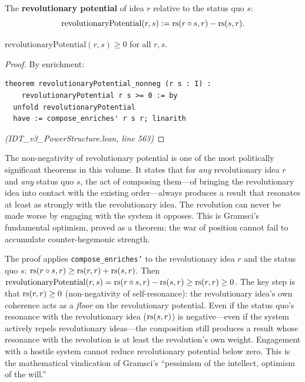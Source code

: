 \begin{definition}
\label{def:revolutionary}
The \textbf{revolutionary potential} of idea $r$ relative to the status quo $s$:
\[
  \mathrm{revolutionaryPotential}(r, s) := \mathrm{rs}(r \circ s, r) - \mathrm{rs}(s, r).
\]
\end{definition}

\begin{theorem}
\label{thm:rev-nonneg}
$\mathrm{revolutionaryPotential}(r, s) \geq 0$ for all $r, s$.
\end{theorem}

\begin{proof}
By enrichment:
\begin{lstlisting}
theorem revolutionaryPotential_nonneg (r s : I) :
    revolutionaryPotential r s >= 0 := by
  unfold revolutionaryPotential
  have := compose_enriches' r s r; linarith
\end{lstlisting}
\textit{(IDT\_v3\_PowerStructure.lean, line 563)}
\end{proof}

\begin{interpretation}
The non-negativity of revolutionary potential is one of the most politically
significant theorems in this volume. It states that for \emph{any} revolutionary
idea $r$ and \emph{any} status quo $s$, the act of composing them---of bringing
the revolutionary idea into contact with the existing order---always produces
a result that resonates at least as strongly with the revolutionary idea. The
revolution can never be made worse by engaging with the system it opposes. This
is Gramsci's fundamental optimism, proved as a theorem: the war of position
cannot fail to accumulate counter-hegemonic strength.
\end{interpretation}

\begin{remark}
The proof applies \texttt{compose\_enriches'} to the revolutionary idea $r$
and the status quo $s$: $\mathrm{rs}(r \circ s, r) \geq \mathrm{rs}(r,r) + \mathrm{rs}(s,r)$.
Then $\mathrm{revolutionaryPotential}(r,s) = \mathrm{rs}(r \circ s, r) - \mathrm{rs}(s,r)
\geq \mathrm{rs}(r,r) \geq 0$. The key step is that $\mathrm{rs}(r,r) \geq 0$ (non-negativity
of self-resonance): the revolutionary idea's own coherence acts as a
\emph{floor} on the revolutionary potential. Even if the status quo's resonance
with the revolutionary idea ($\mathrm{rs}(s,r)$) is negative---even if the system
actively repels revolutionary ideas---the composition still produces a result
whose resonance with the revolution is at least the revolution's own weight.
Engagement with a hostile system cannot reduce revolutionary potential below
zero. This is the mathematical vindication of Gramsci's ``pessimism of the
intellect, optimism of the will.''
\end{remark}

